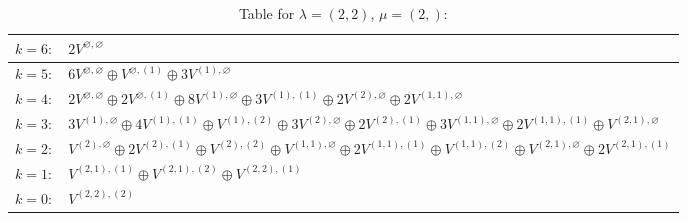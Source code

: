 \renewcommand{\arraystretch}{1.6} 
\begin{table}[H]
\centering
\caption{Table for $\lambda = (2, 2)$, $\mu = (2,)$:}
\begin{tabular}{|>{\centering\arraybackslash}p{15cm}|}
\hline
 $k = 6: \quad 2 V^{\varnothing, \varnothing} $ \\ \hline
 $k = 5: \quad 6 V^{\varnothing, \varnothing} \oplus V^{\varnothing, (1)} \oplus 3 V^{(1), \varnothing} $ \\ \hline
 $k = 4: \quad 2 V^{\varnothing, \varnothing} \oplus 2 V^{\varnothing, (1)} \oplus 8 V^{(1), \varnothing} \oplus 3 V^{(1), (1)} \oplus 2 V^{(2), \varnothing} \oplus 2 V^{(1, 1), \varnothing} $ \\ \hline
 $k = 3: \quad 3 V^{(1), \varnothing} \oplus 4 V^{(1), (1)} \oplus V^{(1), (2)} \oplus 3 V^{(2), \varnothing} \oplus 2 V^{(2), (1)} \oplus 3 V^{(1, 1), \varnothing} \oplus 2 V^{(1, 1), (1)} \oplus V^{(2, 1), \varnothing} $ \\ \hline
 $k = 2: \quad V^{(2), \varnothing} \oplus 2 V^{(2), (1)} \oplus V^{(2), (2)} \oplus V^{(1, 1), \varnothing} \oplus 2 V^{(1, 1), (1)} \oplus V^{(1, 1), (2)} \oplus V^{(2, 1), \varnothing} \oplus 2 V^{(2, 1), (1)} $ \\ \hline
 $k = 1: \quad V^{(2, 1), (1)} \oplus V^{(2, 1), (2)} \oplus V^{(2, 2), (1)} $ \\ \hline
 $k = 0: \quad V^{(2, 2), (2)} $ \\ \hline
\end{tabular}
\end{table}

